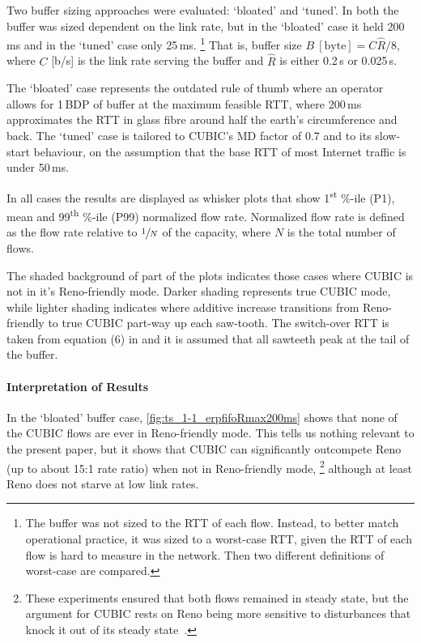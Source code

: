 Two buffer sizing approaches were evaluated: `bloated' and `tuned'. In both the buffer was sized dependent on the link rate, but in the `bloated' case it held  200\,ms and in the `tuned' case only 25\,ms.%
\footnote{The buffer was not sized to the RTT of each flow. Instead, to better match operational practice, it was sized to a worst-case RTT, given the RTT of each flow is hard to measure in the network. Then two different definitions of worst-case are compared.}
That is, buffer size \(B\:[\textrm{byte}] = C\widehat{R}/8\), where \(C\) [b/s] is the link rate serving the buffer and \(\widehat{R}\) is either 0.2\,s or 0.025\,s. 

The `bloated' case represents the outdated rule of thumb where an operator allows for 1\,BDP of buffer at the maximum feasible RTT, where 200\,ms approximates the RTT in glass fibre around half the earth's circumference and back. The `tuned' case is tailored to CUBIC's MD factor of 0.7 and to its slow-start behaviour, on the assumption that the base RTT of most Internet traffic is under 50\,ms.

In all cases the results are displayed as whisker plots that show 1\textsuperscript{st} \%-ile (P1), mean and 99\textsuperscript{th} \%-ile (P99) normalized flow rate. Normalized flow rate is defined as the flow rate relative to \(\sfrac{1}{N}\) of the capacity, where \(N\) is the total number of flows.

The shaded background of part of the plots indicates those cases where CUBIC is not in it's Reno-friendly mode. Darker shading represents true CUBIC mode, while lighter shading indicates where additive increase transitions from Reno-friendly to true CUBIC part-way up each saw-tooth. The switch-over RTT is taken from equation (6) in \cite{Briscoe21c:pi2param} and it is assumed that all sawteeth peak at the tail of the buffer.

\paragraph{Interpretation of Results}

In the `bloated' buffer case, \autoref{fig:ts_1-1_erpfifoRmax200ms} shows that none of the CUBIC flows are ever in Reno-friendly mode. This tells us nothing relevant to the present paper, but it shows that CUBIC can significantly outcompete Reno (up to about 15:1 rate ratio) when not in Reno-friendly mode,%
\footnote{These experiments ensured that both flows remained in steady state, but the argument for CUBIC rests on Reno being more sensitive to disturbances that knock it out of its steady state~\cite{HA2007:CUBIC_bg}.}
although at least Reno does not starve at low link rates.

